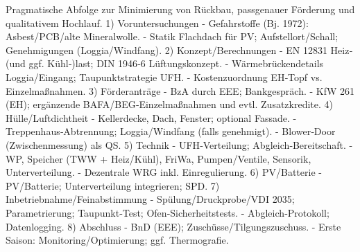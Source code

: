 \markdownRendererDocumentBegin
\markdownRendererSectionBegin
{}\markdownRendererInterblockSeparator
{}Pragmatische Abfolge zur Minimierung von Rückbau, passgenauer Förderung und qualitativem Hochlauf.\markdownRendererInterblockSeparator
{}\markdownRendererSectionBegin
{}\markdownRendererInterblockSeparator
{}1) Voruntersuchungen - Gefahrstoffe (Bj. 1972): Asbest/PCB/alte Mineralwolle. - Statik Flachdach für PV; Aufstellort/Schall; Genehmigungen (Loggia/Windfang).\markdownRendererInterblockSeparator
{}2) Konzept/Berechnungen - EN 12831 Heiz‑ (und ggf. Kühl‑)last; DIN 1946‑6 Lüftungskonzept. - Wärmebrückendetails Loggia/Eingang; Taupunktstrategie UFH. - Kostenzuordnung EH‑Topf vs. Einzelmaßnahmen.\markdownRendererInterblockSeparator
{}3) Förderanträge - BzA durch EEE; Bankgespräch. - KfW 261 (EH); ergänzende BAFA/BEG‑Einzelmaßnahmen und evtl. Zusatzkredite.\markdownRendererInterblockSeparator
{}4) Hülle/Luftdichtheit - Kellerdecke, Dach, Fenster; optional Fassade. - Treppenhaus‑Abtrennung; Loggia/Windfang (falls genehmigt). - Blower‑Door (Zwischenmessung) als QS.\markdownRendererInterblockSeparator
{}5) Technik - UFH‑Verteilung; Abgleich‑Bereitschaft. - WP, Speicher (TWW + Heiz/Kühl), FriWa, Pumpen/Ventile, Sensorik, Unterverteilung. - Dezentrale WRG inkl. Einregulierung.\markdownRendererInterblockSeparator
{}6) PV/Batterie - PV/Batterie; Unterverteilung integrieren; SPD.\markdownRendererInterblockSeparator
{}7) Inbetriebnahme/Feinabstimmung - Spülung/Druckprobe/VDI 2035; Parametrierung; Taupunkt‑Test; Ofen‑Sicherheitstests. - Abgleich‑Protokoll; Datenlogging.\markdownRendererInterblockSeparator
{}8) Abschluss - BnD (EEE); Zuschüsse/Tilgungszuschuss. - Erste Saison: Monitoring/Optimierung; ggf. Thermografie.
\markdownRendererSectionEnd 
\markdownRendererSectionEnd \markdownRendererDocumentEnd